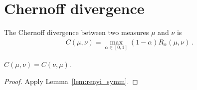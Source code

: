 \chapter{Chernoff divergence}

\begin{definition}
  \label{def:Chernoff}
    The Chernoff divergence between two measures $\mu$ and $\nu$ is
  \begin{align*}
    C(\mu, \nu) = \max_{\alpha\in [0,1]} (1 - \alpha)R_\alpha(\mu, \nu) \: .
  \end{align*}
\end{definition}

\begin{lemma}
  \label{lem:chernoff_symm}
  $C(\mu, \nu) = C(\nu, \mu)$.
\end{lemma}

\begin{proof}
Apply Lemma~\ref{lem:renyi_symm}.
\end{proof}